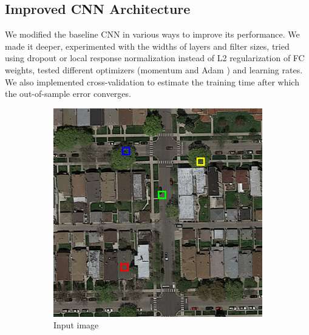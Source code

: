 \documentclass[10pt,conference,compsocconf]{IEEEtran}
\begin{document}
\subsection{Improved CNN Architecture}
\label{subsec:CNN}
We modified the baseline CNN in various ways to improve its performance. We made it deeper, experimented with the widths of layers and filter sizes, tried using dropout or local response normalization instead of L2 regularization of FC weights, tested different optimizers (momentum and Adam \cite{Adam.2014}) and learning rates. We also implemented cross-validation to estimate the training time after which the out-of-sample error converges.

\begin{figure}
	\centering
	\begin{subfigure}[t]{.15\textwidth}
		\includegraphics[width=1\textwidth]{figs/context_size/full_img}
		\caption{Input image}
	\end{subfigure}
	\begin{subfigure}[t]{.15\textwidth}

\end{subfigure}
\end{figure}
\end{document}
